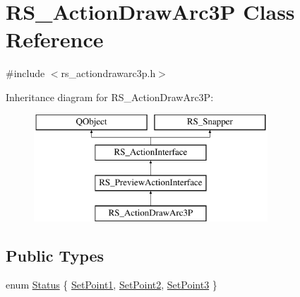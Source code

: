 \hypertarget{classRS__ActionDrawArc3P}{\section{R\-S\-\_\-\-Action\-Draw\-Arc3\-P Class Reference}
\label{classRS__ActionDrawArc3P}
}


{\ttfamily \#include $<$rs\-\_\-actiondrawarc3p.\-h$>$}

Inheritance diagram for R\-S\-\_\-\-Action\-Draw\-Arc3\-P\-:\begin{figure}[H]
\begin{center}
\leavevmode
\includegraphics[height=4.000000cm]{classRS__ActionDrawArc3P}
\end{center}
\end{figure}
\subsection*{Public Types}
\begin{DoxyCompactItemize}
\item 
enum \hyperlink{classRS__ActionDrawArc3P_abef0667f59d3e9af1c7a227f58292397}{Status} \{ \hyperlink{classRS__ActionDrawArc3P_abef0667f59d3e9af1c7a227f58292397a822c6f2a303fc63ec97a85efcda26b05}{Set\-Point1}, 
\hyperlink{classRS__ActionDrawArc3P_abef0667f59d3e9af1c7a227f58292397abb87b2fd3b5ca09ccbd86121c7f9d5ee}{Set\-Point2}, 
\hyperlink{classRS__ActionDrawArc3P_abef0667f59d3e9af1c7a227f58292397a51d6b924b39ea5b34c18352d68ba65c5}{Set\-Point3}
 \}
\end{DoxyCompactItemize}
